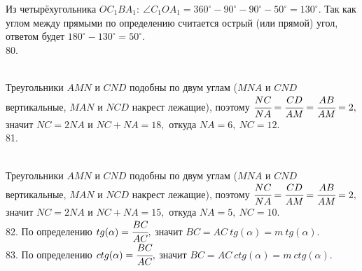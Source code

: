 \documentclass[12pt]{article}
\begin{document}
Из четырёхугольника $OC_1BA_1:\ \angle C_1OA_1=360^\circ-90^\circ-90^\circ-50^\circ=130^\circ.$ Так как углом между прямыми по определению считается острый (или прямой) угол, ответом будет $180^\circ-130^\circ=50^\circ.$\\
80. \begin{figure}[ht!]
\end{figure}\\
Треугольники $AMN$ и $CND$ подобны по двум углам ($MNA$ и $CND$ вертикальные, $MAN$ и $NCD$ накрест лежащие), поэтому $\cfrac{NC}{NA}=\cfrac{CD}{AM}=\cfrac{AB}{AM}=2,$ значит $NC=2NA$ и $NC+NA=18,$ откуда $NA=6,\ NC=12.$\\
81. \begin{figure}[ht!]
\end{figure}\\
Треугольники $AMN$ и $CND$ подобны по двум углам ($MNA$ и $CND$ вертикальные, $MAN$ и $NCD$ накрест лежащие), поэтому $\cfrac{NC}{NA}=\cfrac{CD}{AM}=\cfrac{AB}{AM}=2,$ значит $NC=2NA$ и $NC+NA=15,$ откуда $NA=5,\ NC=10.$\\
82. По определению $tg(\alpha)=\cfrac{BC}{AC},$ значит $BC=AC\ tg(\alpha)=m\ tg(\alpha).$\\
83. По определению $ctg(\alpha)=\cfrac{BC}{AC},$ значит $BC=AC\ ctg(\alpha)=m\ ctg(\alpha).$\\
\end{document}
